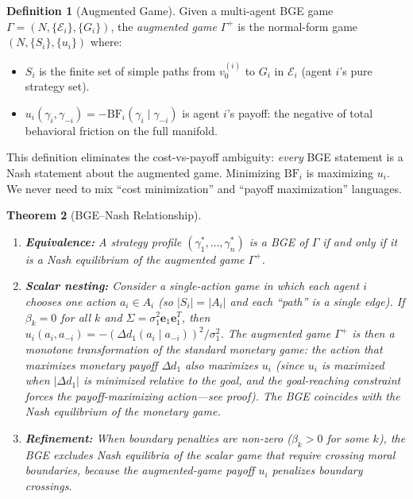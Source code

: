 \documentclass[12pt]{article}
\newtheorem{theorem}{Theorem}[section]
\theoremstyle{definition}
\newtheorem{definition}[theorem]{Definition}
\theoremstyle{remark}
\newcommand{\E}{\mathcal{E}}               %
\newcommand{\BF}{\mathrm{BF}}              %
\begin{document}
\begin{definition}[Augmented Game]
\label{def:augmented_game}
Given a multi-agent BGE game $\Gamma = (N, \{\E_i\}, \{G_i\})$, the \emph{augmented game} $\Gamma^+$ is the normal-form game $(N, \{S_i\}, \{u_i\})$ where:
\begin{itemize}
    \item $S_i$ is the finite set of simple paths from $v_0^{(i)}$ to $G_i$ in $\E_i$ (agent $i$'s pure strategy set).
    \item $u_i(\gamma_i, \gamma_{-i}) = -\BF_i(\gamma_i \mid \gamma_{-i})$ is agent $i$'s payoff: the negative of total behavioral friction on the full manifold.
\end{itemize}
\end{definition}

This definition eliminates the cost-vs-payoff ambiguity: \emph{every} BGE statement is a Nash statement about the augmented game.  Minimizing $\BF_i$ is maximizing $u_i$.  We never need to mix ``cost minimization'' and ``payoff maximization'' languages.

\begin{theorem}[BGE--Nash Relationship]
\label{thm:nash_relationship}
\hfill
\begin{enumerate}
    \item \textbf{Equivalence:} A strategy profile $(\gamma_1^*, \ldots, \gamma_n^*)$ is a BGE of $\Gamma$ if and only if it is a Nash equilibrium of the augmented game $\Gamma^+$.
    \item \textbf{Scalar nesting:} Consider a \emph{single-action game} in which each agent $i$ chooses one action $a_i \in A_i$ (so $|S_i| = |A_i|$ and each ``path'' is a single edge).  If $\beta_k = 0$ for all $k$ and $\Sigma = \sigma_1^2 \mathbf{e}_1 \mathbf{e}_1^T$, then $u_i(a_i, a_{-i}) = -(\Delta d_1(a_i \mid a_{-i}))^2 / \sigma_1^2$.  The augmented game $\Gamma^+$ is then a monotone transformation of the standard monetary game: the action that maximizes monetary payoff $\Delta d_1$ also maximizes $u_i$ (since $u_i$ is maximized when $|\Delta d_1|$ is minimized relative to the goal, and the goal-reaching constraint forces the payoff-maximizing action---see proof).  The BGE coincides with the Nash equilibrium of the monetary game.
    \item \textbf{Refinement:} When boundary penalties are non-zero ($\beta_k > 0$ for some $k$), the BGE excludes Nash equilibria of the scalar game that require crossing moral boundaries, because the augmented-game payoff $u_i$ penalizes boundary crossings.
\end{enumerate}
\end{theorem}
\end{document}
